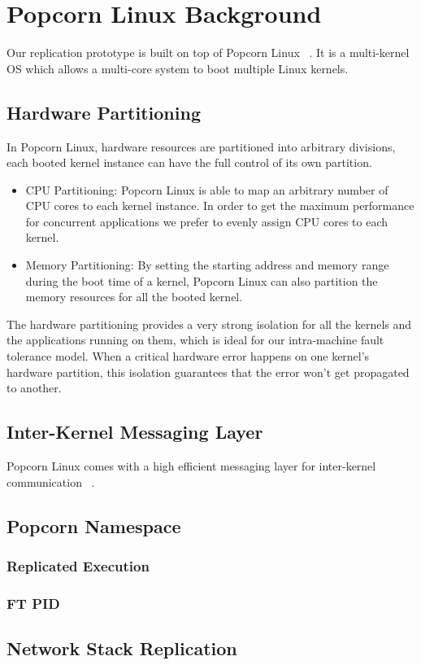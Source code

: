 \chapter{Popcorn Linux Background}
Our replication prototype is built on top of Popcorn Linux ~\cite{barbalace2014popcorn}. It is a multi-kernel OS which allows a multi-core system to boot multiple Linux kernels.
\section{Hardware Partitioning}
In Popcorn Linux, hardware resources are partitioned into arbitrary divisions, each booted kernel instance can have the full control of its own partition.

\begin{itemize}
\item{CPU Partitioning:} Popcorn Linux is able to map an arbitrary number of CPU cores to each kernel instance. In order to get the maximum performance for concurrent applications we prefer to evenly assign CPU cores to each kernel.

\item{Memory Partitioning:} By setting the starting address and memory range during the boot time of a kernel, Popcorn Linux can also partition the memory resources for all the booted kernel.
\end{itemize}

The hardware partitioning provides a very strong isolation for all the kernels and the applications running on them, which is ideal for our intra-machine fault tolerance model. When a critical hardware error happens on one kernel's hardware partition, this isolation guarantees that the error won't get propagated to another.

\section{Inter-Kernel Messaging Layer}
Popcorn Linux comes with a high efficient messaging layer for inter-kernel communication ~\cite{shelton2013popcorn}.

\section{Popcorn Namespace}
\subsection{Replicated Execution}
\subsection{FT PID}
\section{Network Stack Replication}
